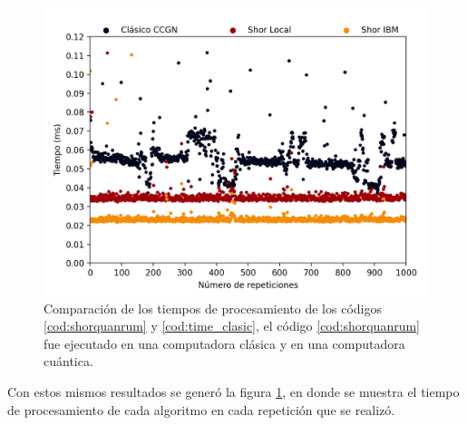\begin{figure}[H]
    \centering
    \includegraphics[scale=0.7]{images/time.png}
    \caption{Comparación de los tiempos de procesamiento de los códigos \ref{cod:shorquanrum} y \ref{cod:time_clasic}, el código \ref{cod:shorquanrum} fue 
    ejecutado en una computadora clásica y en una computadora cuántica.}
    \label{fig:time}
\end{figure}
Con estos mismos resultados se generó la figura \ref{fig:time}, en donde se muestra el tiempo de procesamiento de cada algoritmo en cada repetición que se realizó.